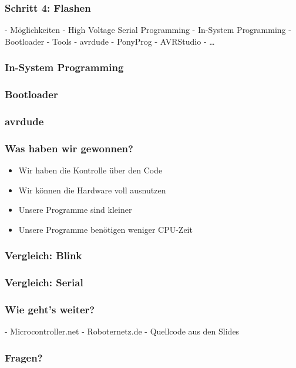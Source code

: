 \documentclass{beamer}
\begin{document}
\begin{frame}
\frametitle{Schritt 4: Flashen}
- Möglichkeiten
    - High Voltage Serial Programming 
    - In-System Programming
    - Bootloader
- Tools
  - avrdude
  - PonyProg
  - AVRStudio
  - …
\end{frame}

\begin{frame}
\frametitle{In-System Programming}
\end{frame}

\begin{frame}
\frametitle{Bootloader}
\end{frame}

\begin{frame}
\frametitle{avrdude}
\end{frame}

\begin{frame}
\frametitle{Was haben wir gewonnen?}
\begin{itemize}
\item Wir haben die Kontrolle über den Code
\item Wir können die Hardware voll ausnutzen
\item Unsere Programme sind kleiner
\item Unsere Programme benötigen weniger CPU-Zeit
\end{itemize}
\end{frame}

\begin{frame}
\frametitle{Vergleich: Blink}
\end{frame}

\begin{frame}
\frametitle{Vergleich: Serial}
\end{frame}

\begin{frame}
\frametitle{Wie geht's weiter?}
- Microcontroller.net
- Roboternetz.de
- Quellcode aus den Slides
\end{frame}

\begin{frame}
\frametitle{Fragen?}
\end{frame}
\end{document}
